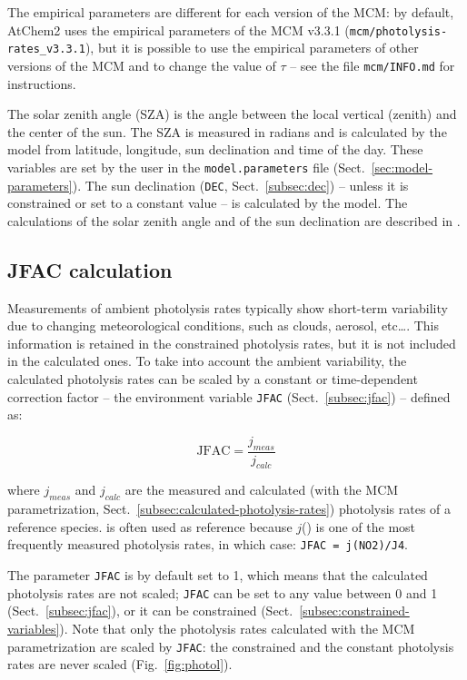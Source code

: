 The empirical parameters are different for each version of the MCM: by
default, AtChem2 uses the empirical parameters of the MCM v3.3.1
(\texttt{mcm/photolysis-rates\_v3.3.1}), but it is possible to use the
empirical parameters of other versions of the MCM and to change the
value of $\tau$ -- see the file \texttt{mcm/INFO.md} for instructions.

The solar zenith angle (SZA) is the angle between the local vertical
(zenith) and the center of the sun. The SZA is measured in radians and
is calculated by the model from latitude, longitude, sun declination
and time of the day. These variables are set by the user in the
\texttt{model.parameters} file (Sect.~\ref{sec:model-parameters}). The
sun declination (\texttt{DEC}, Sect.~\ref{subsec:dec}) -- unless it is
constrained or set to a constant value -- is calculated by the
model. The calculations of the solar zenith angle and of the sun
declination are described in \citet{madronich_1993}.

\subsection{JFAC calculation} \label{subsec:jfac-calculation}

Measurements of ambient photolysis rates typically show short-term
variability due to changing meteorological conditions, such as clouds,
aerosol, etc\ldots \citep{sommariva_2020}. This information is
retained in the constrained photolysis rates, but it is not included
in the calculated ones. To take into account the ambient variability,
the calculated photolysis rates can be scaled by a constant or
time-dependent correction factor -- the environment variable
\texttt{JFAC} (Sect.~\ref{subsec:jfac}) -- defined as:

\begin{equation}
  \mathrm{JFAC} = \frac{j_{meas}}{j_{calc}}
\end{equation}

where $j_{meas}$ and $j_{calc}$ are the measured and calculated (with
the MCM parametrization, Sect.~\ref{subsec:calculated-photolysis-rates})
photolysis rates of a reference species.  is often used as
reference because $j$() is one of the most frequently measured
photolysis rates, in which case: \verb|JFAC = j(NO2)/J4|.

The parameter \texttt{JFAC} is by default set to 1, which means that
the calculated photolysis rates are not scaled; \texttt{JFAC} can be
set to any value between 0 and 1 (Sect.~\ref{subsec:jfac}), or it can
be constrained (Sect.~\ref{subsec:constrained-variables}). Note that
only the photolysis rates calculated with the MCM parametrization are
scaled by \texttt{JFAC}: the constrained and the constant photolysis
rates are never scaled (Fig.~\ref{fig:photol}).

